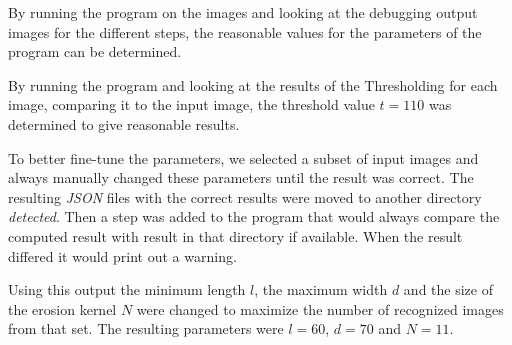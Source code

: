 By running the program on the images and looking at the debugging output images
for the different steps, the reasonable values for the parameters of the program
can be determined.

By running the program and looking at the results of the Thresholding for each
image, comparing it to the input image, the threshold value $t = 110$ was
determined to give reasonable results.

To better fine-tune the parameters, we selected a subset of input images and
always manually changed these parameters until the result was correct. The
resulting \textit{JSON} files with the correct results were moved to another
directory \textit{detected}. Then a step was added to the program that would
always compare the computed result with result in that directory if available.
When the result differed it would print out a warning.

Using this output the minimum length $l$, the maximum width $d$ and the size of
the erosion kernel $N$ were changed to maximize the number of recognized images
from that set. The resulting parameters were $l = 60$, $d = 70$ and $N =11$.
